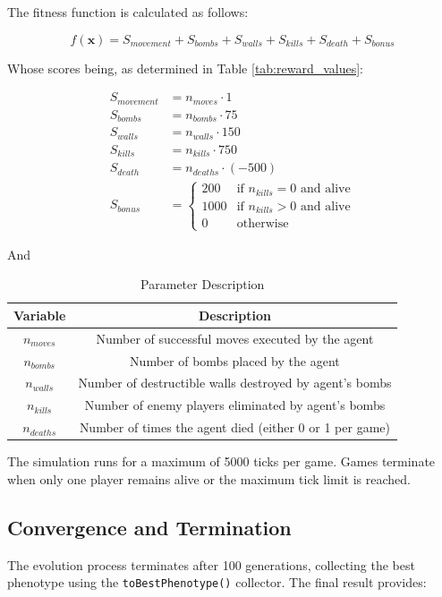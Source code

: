 \documentclass[sigconf]{acmart} %
\begin{document}
The fitness function is calculated as follows:

\begin{equation}
f(\mathbf{x}) = S_{movement} + S_{bombs} + S_{walls} + S_{kills} + S_{death} + S_{bonus}
\end{equation}

Whose scores being, as determined in Table \ref{tab:reward_values}:

\begin{align}
S_{movement} &= n_{moves} \cdot 1 \\
S_{bombs} &= n_{bombs} \cdot 75 \\
S_{walls} &= n_{walls} \cdot 150 \\
S_{kills} &= n_{kills} \cdot 750 \\
S_{death} &= n_{deaths} \cdot (-500) \\
S_{bonus} &= \begin{cases}
200 & \text{if } n_{kills} = 0 \text{ and } \text{alive} \\
1000 & \text{if } n_{kills} > 0 \text{ and } \text{alive} \\
0 & \text{otherwise}
\end{cases}
\end{align}

And

\begin{table}[H]
    \centering
    \begin{tabular}{|c|c|}
     \hline
    \textbf{Variable} & \textbf{Description} \\
    \hline
$n_{moves}$ & Number of successful moves executed by the agent \\
$n_{bombs}$ & Number of bombs placed by the agent \\
$n_{walls}$ & Number of destructible walls destroyed by agent's bombs \\
$n_{kills}$ & Number of enemy players eliminated by agent's bombs \\
$n_{deaths}$ & Number of times the agent died (either 0 or 1 per game) \\
\hline
    \end{tabular}
    \caption{Parameter Description}
    \label{tab:placeholder}
\end{table}

The simulation runs for a maximum of 5000 ticks per game. Games terminate when only one player remains alive or the maximum tick limit is reached.

\subsection{Convergence and Termination}
The evolution process terminates after 100 generations, collecting the best phenotype using the \texttt{toBestPhenotype()} collector. The final result provides:
\end{document}

